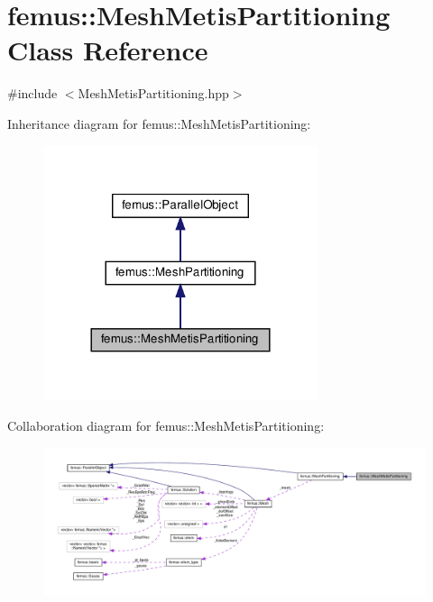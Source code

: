 \hypertarget{classfemus_1_1_mesh_metis_partitioning}{}\section{femus\+:\+:Mesh\+Metis\+Partitioning Class Reference}
\label{classfemus_1_1_mesh_metis_partitioning}


{\ttfamily \#include $<$Mesh\+Metis\+Partitioning.\+hpp$>$}



Inheritance diagram for femus\+:\+:Mesh\+Metis\+Partitioning\+:
\nopagebreak
\begin{figure}[H]
\begin{center}
\leavevmode
\includegraphics[width=228pt]{classfemus_1_1_mesh_metis_partitioning__inherit__graph}
\end{center}
\end{figure}


Collaboration diagram for femus\+:\+:Mesh\+Metis\+Partitioning\+:
\nopagebreak
\begin{figure}[H]
\begin{center}
\leavevmode
\includegraphics[width=350pt]{classfemus_1_1_mesh_metis_partitioning__coll__graph}
\end{center}
\end{figure}
